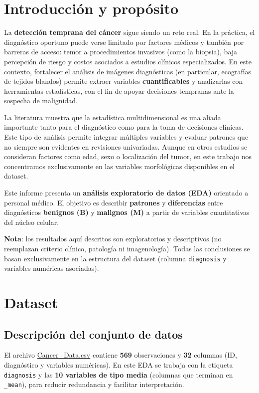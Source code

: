 \documentclass[12pt,a4paper]{article}
\begin{document}
\hypersetup{pageanchor=true}

\tableofcontents
\newpage

\section*{Introducción y propósito}

La \textbf{detección temprana del cáncer} sigue siendo un reto real. En la práctica, el diagnóstico oportuno puede verse limitado por factores médicos y también por barreras de acceso: temor a procedimientos invasivos (como la biopsia), baja percepción de riesgo y costos asociados a estudios clínicos especializados. En este contexto, fortalecer el análisis de imágenes diagnósticas (en particular, ecografías de tejidos blandos) permite extraer variables \textbf{cuantificables} y analizarlas con herramientas estadísticas, con el fin de apoyar decisiones tempranas ante la sospecha de malignidad.

La literatura muestra que la estadística multidimensional es una aliada importante tanto para el diagnóstico como para la toma de decisiones clínicas. Este tipo de análisis permite integrar múltiples variables y evaluar patrones que no siempre son evidentes en revisiones univariadas. Aunque en otros estudios se consideran factores como edad, sexo o localización del tumor, en este trabajo nos concentramos exclusivamente en las variables morfológicas disponibles en el dataset.

Este informe presenta un \textbf{análisis exploratorio de datos (EDA)} orientado a personal médico. El objetivo es describir \textbf{patrones} y \textbf{diferencias} entre diagnósticos \textbf{benignos (B)} y \textbf{malignos (M)} a partir de variables cuantitativas del núcleo celular.

\textbf{Nota}: los resultados aquí descritos son exploratorios y descriptivos (no reemplazan criterio clínico, patología ni imagenología). Todas las conclusiones se basan exclusivamente en la estructura del dataset (columna \texttt{diagnosis} y variables numéricas asociadas).


\section{Dataset}

\subsection{Descripción del conjunto de datos}
El archivo \href{https://www.kaggle.com/datasets/erdemtaha/cancer-data}{Cancer\_Data.csv} contiene \textbf{569} observaciones y \textbf{32} columnas (ID, diagnóstico y variables numéricas). En este EDA se trabaja con la etiqueta \texttt{diagnosis} y las \textbf{10 variables de tipo media} (columnas que terminan en \texttt{\_mean}), para reducir redundancia y facilitar interpretación.
\end{document}
